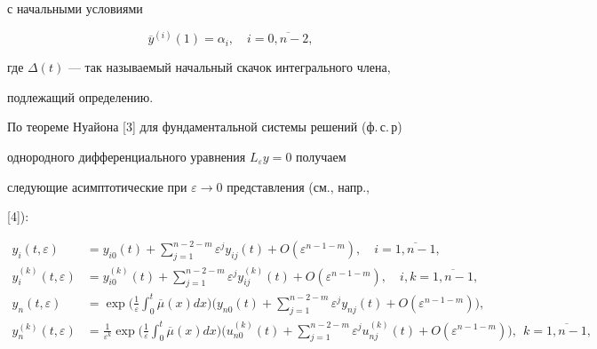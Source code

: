 с начальными условиями


\begin{equation}


\label{eq6}


\overline {y}^{(i)}(1)=\alpha _{i}, \quad i=\overline{0,n-2},


\end{equation}


где $\Delta (t)$ --- так называемый начальный скачок интегрального члена, 


подлежащий определению. 





По теореме Нуайона [3] для фундаментальной системы решений (ф.\,с.\,р) 


однородного дифференциального уравнения $L_{\varepsilon}  y = 0$ получаем 


следующие асимптотические при $\varepsilon \to 0$ представления (см., напр.,


[4]):


\begin{align*}


y_{i} (t,\varepsilon)&=y_{i0}(t)+\sum\limits_{j=1}^{n-2-m}


\varepsilon^{j}y_{ij}(t)+O(\varepsilon^{n-1-m}), \quad i=\overline{1,n-1}, \\


%


y_{i}^{(k)}(t,\varepsilon)&=y_{i0}^{(k)}(t)+\sum\limits_{j=1}^{n-2-m}


\varepsilon^{j}y_{ij}^{(k)}(t)+O(\varepsilon^{n-1-m}),\quad 


i,k=\overline{1,n-1}, \\


%


y_{n} (t,\varepsilon)&=\exp\bigg(\frac{1}{\varepsilon}


\int_{0}^{t}\overline{\mu}(x)dx\bigg)\bigg(y_{n0}(t)+ 


\sum_{j=1}^{n-2-m}\varepsilon^{j}y_{nj}(t)+  


O(\varepsilon^{n-1-m})\bigg), \\


%


y_{n}^{(k)}(t,\varepsilon)&=\frac{1}{\varepsilon^{k}}


\exp\bigg(\frac{1}{\varepsilon}\int_{0}^{t}\overline{\mu}(x)dx\bigg)


\bigg(u_{n0}^{(k)}(t)+\sum_{j=1}^{n-2-m}


\varepsilon^{j}u_{nj}^{(k)}(t)+O(\varepsilon^{n-1-m})\bigg), \ \


k=\overline{1,n-1},


\end{align*}


